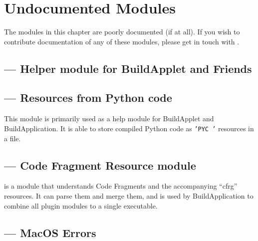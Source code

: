 \chapter{Undocumented Modules \label{undocumented-modules}}


The modules in this chapter are poorly documented (if at all).  If you
wish to contribute documentation of any of these modules, please get in
touch with
.

\localmoduletable


\section{ --- Helper module for BuildApplet and Friends}


\section{ --- Resources from Python code}

This module is primarily used as a help module for BuildApplet and
BuildApplication.  It is able to store compiled Python code as
\texttt{'PYC '} resources in a file.


\section{ --- Code Fragment Resource module}

 is a module that understands Code Fragments and the
accompanying ``cfrg'' resources. It can parse them and merge them, and is
used by BuildApplication to combine all plugin modules to a single
executable.


\section{ --- MacOS Errors}


